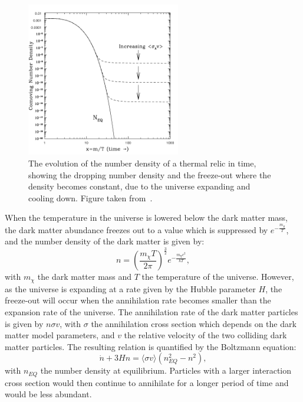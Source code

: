 \begin{itemize}
\begin{figure}[ht]
  \centering
  \includegraphics[width=0.6\textwidth]{freezeout.png}\hfill%
  \caption{The evolution of the number density of a thermal relic in time, showing the dropping number density and the freeze-out where the density becomes constant, due to the universe expanding and cooling down. Figure taken from~\cite{Hooper:2009zm}.}
  \label{fig:freezeout}
\end{figure}

	 When the temperature in the universe is lowered below the dark matter mass, the dark matter abundance freezes out to a value which is suppressed by $e^{-\frac{m_{\chi}}{T}}$, and the number density of the dark matter is given by:
	 \begin{equation}
	  n = \left(\frac{m_{\chi}T}{2\pi} \right)^{\frac{3}{2}} e^{-\frac{m_{\chi}c^2}{kT}},
	 \end{equation}
	 with $m_{\chi}$ the dark matter mass and $T$ the temperature of the universe. However, as the universe is expanding at a rate given by the Hubble parameter $H$, the freeze-out will occur when the annihilation rate becomes smaller than the expansion rate of the universe. The annihilation rate of the dark matter particles is given by $n\sigma v$, with $\sigma$ the annihilation cross section which depends on the dark matter model parameters, and $v$ the relative velocity of the two colliding dark matter particles. The resulting relation is quantified by the Boltzmann equation:
	 \begin{equation}
	  \dot{n} + 3Hn = \langle \sigma v \rangle \left(n_{EQ}^2 - n^2\right),
	 \end{equation}
	 with $n_{EQ}$ the number density at equilibrium. Particles with a larger interaction cross section would then continue to annihilate for a longer period of time and would be less abundant. 
         

\end{itemize}
